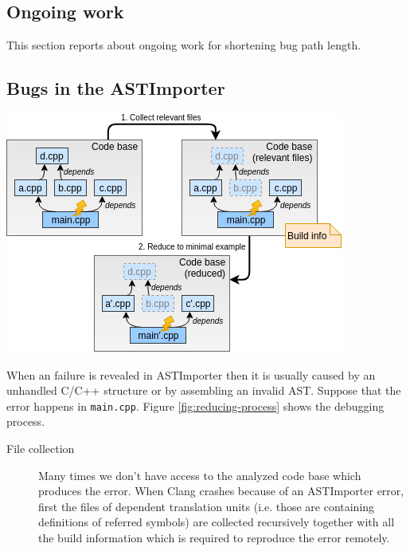 \documentclass[a0,portrait]{a0poster}
\begin{document}
\begin{multicols}{2}
\section*{Ongoing work}

This section reports about ongoing work for shortening bug path length. 


\subsection*{Bugs in the ASTImporter}

\begin{center}\vspace{1cm}
\includegraphics[width=0.8\linewidth]{reducing_process}
\label{fig:reducing-process}
\end{center}\vspace{1cm}

When an failure is revealed in ASTImporter then it is usually caused by an 
unhandled C/C++ structure or by assembling an invalid AST. Suppose that the 
error happens in \texttt{main.cpp}. Figure \ref{fig:reducing-process} shows the 
debugging process.
\begin{description}
  \item[File collection] Many times we don't have access to the analyzed code 
  base which produces the error. When Clang crashes because of an ASTImporter 
  error, first the files of dependent translation units (i.e. those are 
  containing definitions of referred symbols) are collected recursively 
  together with all the build information which is required to reproduce the 
  error remotely.
  

\end{description}
\end{multicols}
\end{document}
